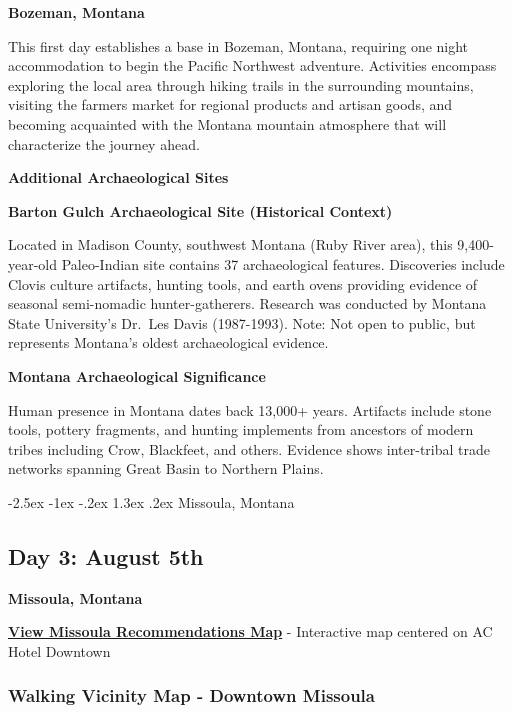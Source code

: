 \documentclass[
  11pt,
  letterpaper,
  DIV=10,
  numbers=noendperiod]{scrartcl}
\makeatletter
\renewcommand{\section}{\@startsection{section}{1}{\z@}%
  {-2.5ex \@plus -1ex \@minus -.2ex}%
  {1.3ex \@plus .2ex}%
  {\normalfont\fontsize{16}{19}\bfseries\color{twinpeaksred}}}
\makeatother
\begin{document}
\textbf{Bozeman, Montana}

This first day establishes a base in Bozeman, Montana, requiring one
night accommodation to begin the Pacific Northwest adventure. Activities
encompass exploring the local area through hiking trails in the
surrounding mountains, visiting the farmers market for regional products
and artisan goods, and becoming acquainted with the Montana mountain
atmosphere that will characterize the journey ahead.

\textbf{Additional Archaeological Sites}

\textbf{Barton Gulch Archaeological Site (Historical Context)}

Located in Madison County, southwest Montana (Ruby River area), this
9,400-year-old Paleo-Indian site contains 37 archaeological features.
Discoveries include Clovis culture artifacts, hunting tools, and earth
ovens providing evidence of seasonal semi-nomadic hunter-gatherers.
Research was conducted by Montana State University's Dr.~Les Davis
(1987-1993). Note: Not open to public, but represents Montana's oldest
archaeological evidence.

\textbf{Montana Archaeological Significance}

Human presence in Montana dates back 13,000+ years. Artifacts include
stone tools, pottery fragments, and hunting implements from ancestors of
modern tribes including Crow, Blackfeet, and others. Evidence shows
inter-tribal trade networks spanning Great Basin to Northern Plains.

\newpage

\section{Missoula, Montana}\label{missoula-montana}

\subsection{Day 3: August 5th}\label{day-3-august-5th}

\textbf{Missoula, Montana}

\textbf{\href{images/missoula_montana_recommendations_map.html}{View
Missoula Recommendations Map}} - Interactive map centered on AC Hotel
Downtown

\subsubsection{Walking Vicinity Map - Downtown
Missoula}\label{walking-vicinity-map---downtown-missoula}
\end{document}
